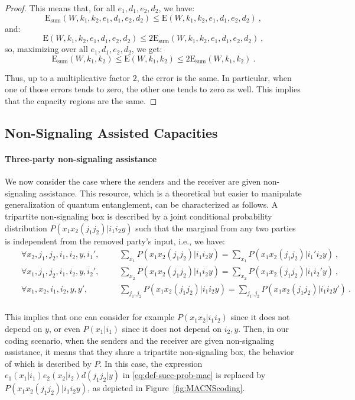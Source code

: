 \begin{proof}
This means that, for all $e_1,d_1,e_2,d_2$, we have:
\[ \mathrm{E}_{\text{sum}}(W,k_1,k_2,e_1,d_1,e_2,d_2) \leq \mathrm{E}(W,k_1,k_2,e_1,d_1,e_2,d_2) \ ,\]
and:
\[ \mathrm{E}(W,k_1,k_2,e_1,d_1,e_2,d_2) \leq 2\mathrm{E}_{\text{sum}}(W,k_1,k_2,e_1,d_1,e_2,d_2) \ ,\]
so, maximizing over all $e_1,d_1,e_2,d_2$, we get:
\[ \mathrm{E}_{\text{sum}}(W,k_1,k_2) \leq \mathrm{E}(W,k_1,k_2) \leq 2\mathrm{E}_{\text{sum}}(W,k_1,k_2) \ .\]

Thus, up to a multiplicative factor $2$, the error is the same. In particular, when one of those errors tends to zero, the other one tends to zero as well. This implies that the capacity regions are the same.
\end{proof}

\subsection{Non-Signaling Assisted Capacities}
\paragraph{Three-party non-signaling assistance} We now consider the case where the senders and the receiver are given non-signaling assistance. This resource, which is a theoretical but easier to manipulate generalization of quantum entanglement, can be characterized as follows. A tripartite non-signaling box is described by a joint conditional probability distribution $P(x_1x_2(j_1j_2)|i_1i_2y)$ such that the marginal from any two parties is independent from the removed party's input, i.e., we have:
\begin{equation}
  \begin{aligned}
    &&\forall x_2,j_1,j_2,i_1,i_2,y,i_1', &&&\sum_{x_1} P(x_1x_2(j_1j_2)|i_1i_2y) = \sum_{x_1} P(x_1x_2(j_1j_2)|i_1'i_2y) \ ,\\
    &&\forall x_1,j_1,j_2,i_1,i_2,y,i_2', &&&\sum_{x_2} P(x_1x_2(j_1j_2)|i_1i_2y) = \sum_{x_2} P(x_1x_2(j_1j_2)|i_1i_2'y) \ ,\\
    &&\forall x_1,x_2,i_1,i_2,y,y', &&&\sum_{j_1,j_2} P(x_1x_2(j_1j_2)|i_1i_2y) = \sum_{j_1,j_2} P(x_1x_2(j_1j_2)|i_1i_2y') \ .\\
  \end{aligned}
\end{equation}

This implies that one can consider for example $P(x_1x_2|i_1i_2)$ since it does not depend on $y$, or even $P(x_1|i_1)$ since it does not depend on $i_2,y$. Then, in our coding scenario, when the senders and the receiver are given non-signaling assistance, it means that they share a tripartite non-signaling box, the behavior of which is described by $P$. In this case, the expression $e_1(x_1|i_1)e_2(x_2|i_2)d(j_1j_2|y)$ in \eqref{eq:def-succ-prob-mac} is replaced by $P(x_1x_2(j_1j_2)|i_1i_2y)$, as depicted in Figure~\ref{fig:MACNScoding}.

